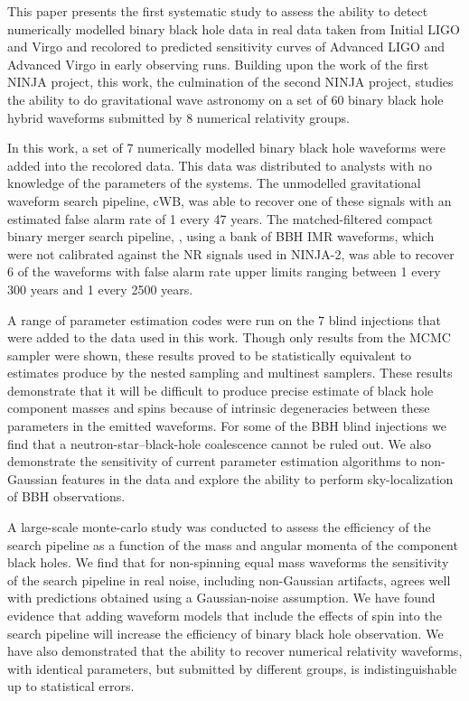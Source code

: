 This paper presents the first systematic study to assess the ability to 
detect numerically modelled binary black hole data in real data taken from 
Initial LIGO and Virgo and recolored to predicted sensitivity curves of 
Advanced LIGO and Advanced Virgo in early observing runs. Building upon the 
work of the first NINJA project, this work, the culmination of the second NINJA 
project, studies the ability to do gravitational wave astronomy on a set of 60 
binary black hole hybrid waveforms submitted by 8 numerical relativity groups. 

In this work, a set of 7 numerically modelled binary black hole waveforms were 
added into the recolored data. This data was distributed to analysts with no 
knowledge of the parameters of the systems. The unmodelled gravitational 
waveform search pipeline, cWB, was able to recover one of these signals with an 
estimated false alarm rate of 1 every 47 years. The matched-filtered compact 
binary merger search pipeline, \ihope{}, using a bank of BBH IMR waveforms, 
which were not calibrated against the NR signals used in NINJA-2, was able 
to recover 6 of the waveforms with false alarm rate upper limits ranging 
between 
1 every 300 years and 1 every 2500 years. 

A range of parameter estimation codes were run on the 7 blind injections 
that were added to the data used in this work. Though only results from
the MCMC sampler were shown, these results proved to be statistically
equivalent to estimates produce by the nested sampling and multinest
samplers. These results demonstrate that it will be difficult to produce 
precise estimate of black hole component masses and spins because of intrinsic 
degeneracies between these parameters in the emitted waveforms. For some of the 
BBH blind injections we find that a neutron-star--black-hole coalescence cannot 
be ruled out. We also demonstrate the sensitivity of current parameter 
estimation algorithms to non-Gaussian features in the data and explore the 
ability to perform sky-localization of BBH observations.

A large-scale monte-carlo study was conducted to assess the efficiency of the 
\ihope{} search pipeline as a function of the mass and angular momenta of the 
component black holes. We find that for non-spinning equal mass waveforms the 
sensitivity of the \ihope{} search pipeline in real noise, including 
non-Gaussian artifacts, agrees well with predictions obtained using a 
Gaussian-noise assumption. We have found evidence that adding waveform models 
that include the effects of spin into the search pipeline will increase the 
efficiency of binary black hole observation. We have also demonstrated that the 
ability to recover numerical relativity waveforms, with identical parameters, 
but submitted by different groups, is indistinguishable up to statistical 
errors.

